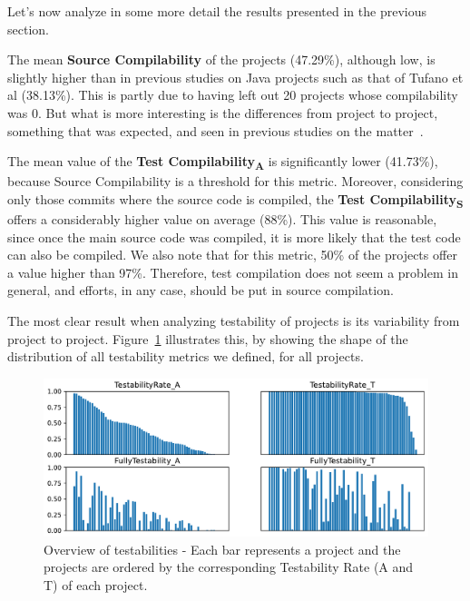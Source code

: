 Let's now analyze in some more detail the results presented in the previous section.

The mean \textbf{Source Compilability} of the projects (47.29\%), although low, is slightly higher than in previous studies on Java projects such as that of Tufano et al (38.13\%). 
This is partly due to having left out 20 projects whose compilability was 0.
But what is more interesting is the differences from project to project, something that was expected, and seen in previous studies on the matter~\cite{tufano2017there,sulir2020large,querel:2021:warning}.

The mean value of the \textbf{Test Compilability\textsubscript{A}} is significantly lower (41.73\%), because Source Compilability is a threshold for this metric.
Moreover, considering only those commits where the source code is compiled, the \textbf{Test Compilability\textsubscript{S}} offers a considerably higher value on average (88\%).
This value is reasonable, since once the main source code was compiled, it is more likely that the test code can also be compiled. 
We also note that for this metric, 50\% of the projects offer a value higher than 97\%.
Therefore, test compilation does not seem a problem in general, and efforts, in any case, should be put in source compilation.



The most clear result when analyzing testability of projects is its variability from project to project. 
Figure~\ref{fig:testability-overview} illustrates this, by showing the shape of the distribution of all testability metrics we defined, for all projects.

\begin{figure}[ht!]
    \centering    
    \includegraphics[width=\textwidth]{pages/02-Testability/images/Overview.pdf}
    \caption{Overview of testabilities - Each bar represents a project and the projects are ordered by the corresponding Testability Rate (A and T) of each project.}
    \label{fig:testability-overview}
\end{figure}

